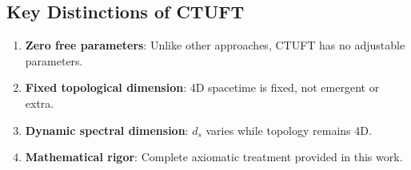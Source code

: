 \subsection{Key Distinctions of CTUFT}

\begin{enumerate}
    \item \textbf{Zero free parameters}: Unlike other approaches, CTUFT has no adjustable parameters.
    
    \item \textbf{Fixed topological dimension}: 4D spacetime is fixed, not emergent or extra.
    
    \item \textbf{Dynamic spectral dimension}: $d_s$ varies while topology remains 4D.
    
    \item \textbf{Mathematical rigor}: Complete axiomatic treatment provided in this work.
\end{enumerate}
